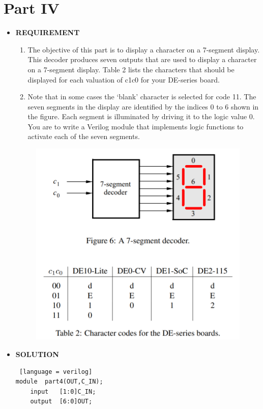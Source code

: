 \section{Part IV }
\begin{itemize}
    \item [] \textbf{REQUIREMENT}
    \begin{enumerate}
        \item The objective of this part is to display a character on a 7-segment display. This decoder produces seven outputs that are used to display a character on a 7-segment display. Table 2 lists the characters that should be displayed for each valuation of c1c0 for your DE-series board.
        \item Note that in some cases the ‘blank’ character is selected for code 11. The seven segments in the display are identified by the indices 0 to 6 shown in the figure. Each segment is illuminated by driving it to the logic value 0. You are to write a Verilog module that implements logic functions to activate each of the seven segments.
    \end{enumerate}    
        \begin{figure}[h]
            \centering
            \includegraphics[scale =0.4]{source/picture/Lab1/1-4.png}
        \end{figure}
    \item [] \textbf{SOLUTION}
        \begin{lstlisting} [language = verilog]
module  part4(OUT,C_IN);
    input 	[1:0]C_IN;
    output	[6:0]OUT;
    

\end{lstlisting}
\end{itemize}
